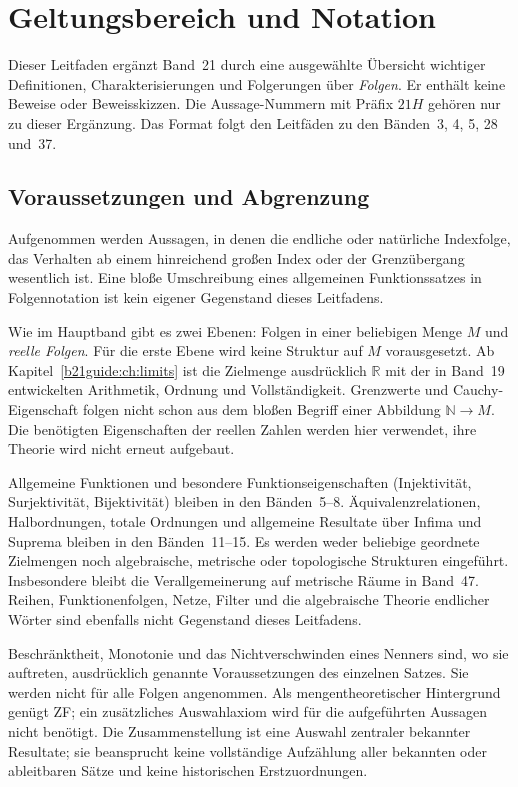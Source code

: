 \chapter{Geltungsbereich und Notation}
\label{b21guide:ch:foundations}

Dieser Leitfaden ergänzt Band~21 durch eine ausgewählte Übersicht
wichtiger Definitionen, Charakterisierungen und Folgerungen über
\emph{Folgen}. Er enthält keine Beweise oder Beweisskizzen.
Die Aussage-Nummern mit Präfix $21H$ gehören nur zu dieser Ergänzung.
Das Format folgt den Leitfäden zu den Bänden~3, 4, 5, 28 und~37.

\section{Voraussetzungen und Abgrenzung}

Aufgenommen werden Aussagen, in denen die endliche oder natürliche
Indexfolge, das Verhalten ab einem hinreichend großen Index oder
der Grenzübergang wesentlich ist. Eine bloße Umschreibung eines
allgemeinen Funktionssatzes in Folgennotation ist kein eigener
Gegenstand dieses Leitfadens.

Wie im Hauptband gibt es zwei Ebenen: Folgen in einer beliebigen
Menge $M$ und \emph{reelle Folgen}. Für die erste Ebene wird keine
Struktur auf $M$ vorausgesetzt. Ab Kapitel~\ref{b21guide:ch:limits}
ist die Zielmenge ausdrücklich $\mathbb R$ mit der in Band~19
entwickelten Arithmetik, Ordnung und Vollständigkeit.
Grenzwerte und Cauchy-Eigenschaft folgen nicht schon aus dem
bloßen Begriff einer Abbildung $\mathbb N\to M$.
Die benötigten Eigenschaften der reellen Zahlen werden hier
verwendet, ihre Theorie wird nicht erneut aufgebaut.

Allgemeine Funktionen und besondere Funktionseigenschaften
(Injektivität, Surjektivität, Bijektivität) bleiben in den
Bänden~5--8. Äquivalenzrelationen, Halbordnungen, totale Ordnungen
und allgemeine Resultate über Infima und Suprema bleiben in den
Bänden~11--15. Es werden weder beliebige geordnete Zielmengen noch
algebraische, metrische oder topologische Strukturen eingeführt.
Insbesondere bleibt die Verallgemeinerung auf metrische Räume
in Band~47. Reihen, Funktionenfolgen, Netze, Filter und
die algebraische Theorie endlicher Wörter sind ebenfalls nicht
Gegenstand dieses Leitfadens.

Beschränktheit, Monotonie und das Nichtverschwinden eines Nenners
sind, wo sie auftreten, ausdrücklich genannte Voraussetzungen
des einzelnen Satzes. Sie werden nicht für alle Folgen angenommen.
Als mengentheoretischer Hintergrund genügt ZF; ein zusätzliches
Auswahlaxiom wird für die aufgeführten Aussagen nicht benötigt.
Die Zusammenstellung ist eine Auswahl zentraler bekannter Resultate;
sie beansprucht keine vollständige Aufzählung aller bekannten
oder ableitbaren Sätze und keine historischen Erstzuordnungen.

